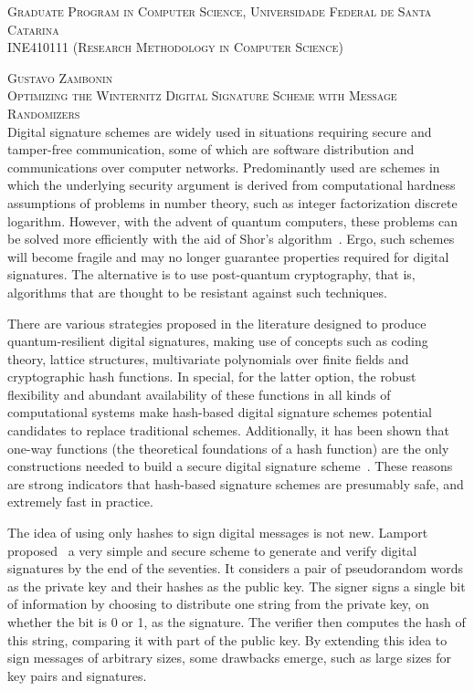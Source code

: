 \documentclass[12pt]{article}
\begin{document}
\textsc{Graduate Program in Computer Science,
  Universidade Federal de Santa Catarina} \\
\textsc{INE410111 (Research Methodology in Computer Science)}

\textsc{Gustavo Zambonin} \\
\textsc{Optimizing the Winternitz Digital Signature Scheme with
Message Randomizers} \\

Digital signature schemes are widely used in situations requiring secure and
tamper-free communication, some of which are software distribution and
communications over computer networks. Predominantly used are schemes in which
the underlying security argument is derived from computational hardness
assumptions of problems in number theory, such as integer factorization
discrete logarithm. However, with the advent of quantum computers, these
problems can be solved more efficiently with the aid of Shor's
algorithm~\cite{Shor:article:1997:oct}. Ergo, such schemes will become fragile
and may no longer guarantee properties required for digital signatures. The
alternative is to use post-quantum cryptography, that is, algorithms that are
thought to be resistant against such techniques.

There are various strategies proposed in the literature designed to produce
quantum-resilient digital signatures, making use of concepts such as coding
theory, lattice structures, multivariate polynomials over finite fields and
cryptographic hash functions. In special, for the latter option, the robust
flexibility and abundant availability of these functions in all kinds of
computational systems make hash-based digital signature schemes potential
candidates to replace traditional schemes. Additionally, it has been shown that
one-way functions (the theoretical foundations of a hash function) are the only
constructions needed to build a secure digital signature
scheme~\cite{Rompel:inproc:1990:may}. These reasons are strong indicators that
hash-based signature schemes are presumably safe, and extremely fast in
practice.

The idea of using only hashes to sign digital messages is not new. Lamport
proposed~\cite{Lamport:report:1979:oct} a very simple and secure scheme to
generate and verify digital signatures by the end of the seventies. It
considers a pair of pseudorandom words as the private key and their hashes as
the public key. The signer signs a single bit of information by choosing to
distribute one string from the private key, on whether the bit is 0 or 1, as
the signature. The verifier then computes the hash of this string, comparing it
with part of the public key. By extending this idea to sign messages of
arbitrary sizes, some drawbacks emerge, such as large sizes for key pairs and
signatures.
\end{document}
